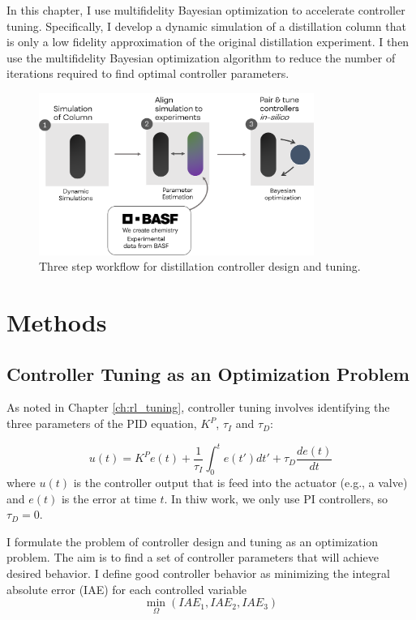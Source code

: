 In this chapter, I use multifidelity Bayesian optimization to accelerate controller tuning. Specifically, I develop a dynamic simulation of a distillation column that is only a low fidelity approximation of the original distillation experiment. I then use the multifidelity Bayesian optimization algorithm to reduce the number of iterations required to find optimal controller parameters. 

\begin{figure}
    \centering
    \includegraphics[width=0.8\textwidth]{gfx/Chapter06/tuning_workflow.png}
    \caption{Three step workflow for distillation controller design and tuning. }
    \label{fig:tuning_workflow}
\end{figure}

\section{Methods}

\subsection{Controller Tuning as an Optimization Problem}

As noted in Chapter \ref{ch:rl_tuning}, controller tuning involves identifying the three parameters of the PID equation, $K^P$, $\tau_I$ and $\tau_D$:

\begin{equation}
    u(t) = K^P e(t) + \frac{1}{\tau_I}\int_0^t e(t')dt' + \tau_D \frac{de(t)}{dt}
\end{equation}
where $u(t)$ is the controller output that is feed into the actuator (e.g., a valve) and $e(t)$ is the error at time $t$. In thiw work, we only use PI controllers, so $\tau_D=0$.

I formulate the problem of controller design and tuning as an optimization problem. The aim is to find a set of controller parameters that will achieve desired behavior. I define good controller behavior as minimizing the integral absolute error (IAE) for each controlled variable
\begin{equation}
    \min_{\Omega}(IAE_1, IAE_2, IAE_3)
\end{equation}


